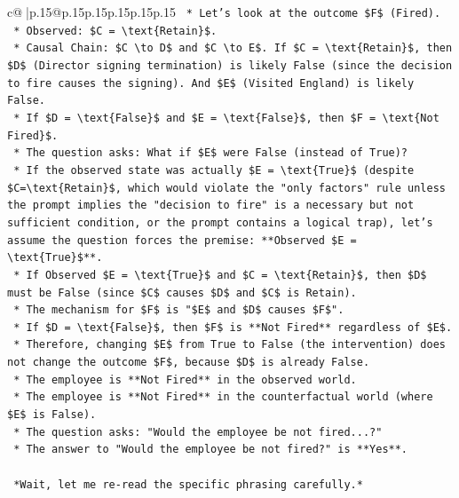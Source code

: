 \documentclass{article}
\begin{document}
{\begin{supertabular}{c@{$\;$}|p{.15\linewidth}@{}p{.15\linewidth}p{.15\linewidth}p{.15\linewidth}p{.15\linewidth}p{.15\linewidth}}
{{{\texttt{        *   Let's look at the outcome \$F\$ (Fired).} \\
\texttt{        *   Observed: \$C = \textbackslash{}text\{Retain\}\$.} \\
\texttt{        *   Causal Chain: \$C \textbackslash{}to D\$ and \$C \textbackslash{}to E\$. If \$C = \textbackslash{}text\{Retain\}\$, then \$D\$ (Director signing termination) is likely False (since the decision to fire causes the signing). And \$E\$ (Visited England) is likely False.} \\
\texttt{        *   If \$D = \textbackslash{}text\{False\}\$ and \$E = \textbackslash{}text\{False\}\$, then \$F = \textbackslash{}text\{Not Fired\}\$.} \\
\texttt{        *   The question asks: What if \$E\$ were False (instead of True)?} \\
\texttt{        *   If the observed state was actually \$E = \textbackslash{}text\{True\}\$ (despite \$C=\textbackslash{}text\{Retain\}\$, which would violate the "only factors" rule unless the prompt implies the "decision to fire" is a necessary but not sufficient condition, or the prompt contains a logical trap), let's assume the question forces the premise: **Observed \$E = \textbackslash{}text\{True\}\$**.} \\
\texttt{        *   If Observed \$E = \textbackslash{}text\{True\}\$ and \$C = \textbackslash{}text\{Retain\}\$, then \$D\$ must be False (since \$C\$ causes \$D\$ and \$C\$ is Retain).} \\
\texttt{        *   The mechanism for \$F\$ is "\$E\$ and \$D\$ causes \$F\$".} \\
\texttt{        *   If \$D = \textbackslash{}text\{False\}\$, then \$F\$ is **Not Fired** regardless of \$E\$.} \\
\texttt{        *   Therefore, changing \$E\$ from True to False (the intervention) does not change the outcome \$F\$, because \$D\$ is already False.} \\
\texttt{        *   The employee is **Not Fired** in the observed world.} \\
\texttt{        *   The employee is **Not Fired** in the counterfactual world (where \$E\$ is False).} \\
\texttt{        *   The question asks: "Would the employee be not fired...?"} \\
\texttt{        *   The answer to "Would the employee be not fired?" is **Yes**.} \\
\\ 
\texttt{    *Wait, let me re{-}read the specific phrasing carefully.*} \\
}}}
\end{supertabular}}
\end{document}
